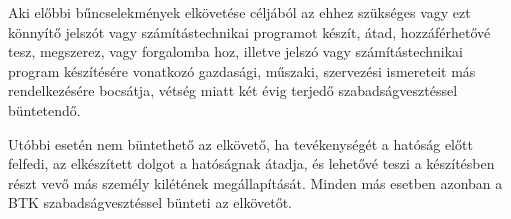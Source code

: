Aki előbbi bűncselekmények elkövetése céljából az ehhez szükséges vagy ezt könnyítő jelszót vagy számítástechnikai programot készít, átad, hozzáférhetővé tesz, megszerez, vagy forgalomba hoz, illetve jelszó vagy számítástechnikai program készítésére vonatkozó gazdasági, műszaki, szervezési ismereteit más rendelkezésére bocsátja, vétség miatt két évig terjedő szabadságvesztéssel büntetendő.

Utóbbi esetén nem büntethető az elkövető, ha tevékenységét a hatóság előtt felfedi, az elkészített dolgot a hatóságnak átadja, és lehetővé teszi a készítésben részt vevő más személy kilétének megállapítását. Minden más esetben azonban a BTK szabadságvesztéssel bünteti az elkövetőt.